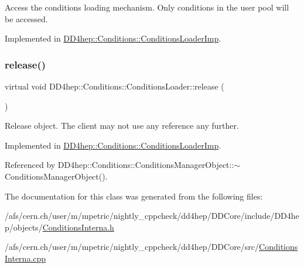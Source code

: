 Access the conditions loading mechanism. Only conditions in the user pool will be accessed. 



Implemented in \hyperlink{class_d_d4hep_1_1_conditions_1_1_conditions_loader_imp_a742f7d5a8d3d0666ee64baa3502982ce}{D\+D4hep\+::\+Conditions\+::\+Conditions\+Loader\+Imp}.

\hypertarget{class_d_d4hep_1_1_conditions_1_1_conditions_loader_a0d1ad39d3ed19e648c673497c6995079}{}\label{class_d_d4hep_1_1_conditions_1_1_conditions_loader_a0d1ad39d3ed19e648c673497c6995079} 
\subsubsection{\texorpdfstring{release()}{release()}}
{\footnotesize\ttfamily virtual void D\+D4hep\+::\+Conditions\+::\+Conditions\+Loader\+::release (\begin{DoxyParamCaption}{ }\end{DoxyParamCaption})\hspace{0.3cm}{\ttfamily [pure virtual]}}



Release object. The client may not use any reference any further. 



Implemented in \hyperlink{class_d_d4hep_1_1_conditions_1_1_conditions_loader_imp_a757ca1fe35b22abe5d4efde0fdc36396}{D\+D4hep\+::\+Conditions\+::\+Conditions\+Loader\+Imp}.



Referenced by D\+D4hep\+::\+Conditions\+::\+Conditions\+Manager\+Object\+::$\sim$\+Conditions\+Manager\+Object().



The documentation for this class was generated from the following files\+:\begin{DoxyCompactItemize}
\item 
/afs/cern.\+ch/user/m/mpetric/nightly\+\_\+cppcheck/dd4hep/\+D\+D\+Core/include/\+D\+D4hep/objects/\hyperlink{_d_d_core_2include_2_d_d4hep_2objects_2_conditions_interna_8h}{Conditions\+Interna.\+h}\item 
/afs/cern.\+ch/user/m/mpetric/nightly\+\_\+cppcheck/dd4hep/\+D\+D\+Core/src/\hyperlink{_d_d_core_2src_2_conditions_interna_8cpp}{Conditions\+Interna.\+cpp}\end{DoxyCompactItemize}
